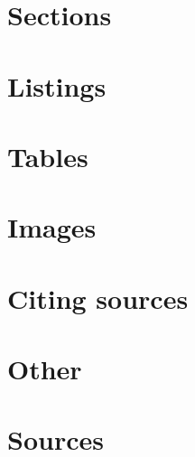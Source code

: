 \documentclass[10pt,xcolor=x11names,compress,fleqn]{beamer}
\begin{document}
  
  
  
  \section{Sections}  
  
  
  
  \section{Listings}  
  
  
  \section{Tables}
  
  
  \section{Images}
  
  
  \section{Citing sources}
  
  
  \section{Other}
  
  
  
  
  
  
  
  \section{Sources}   
  
		
\end{document}
